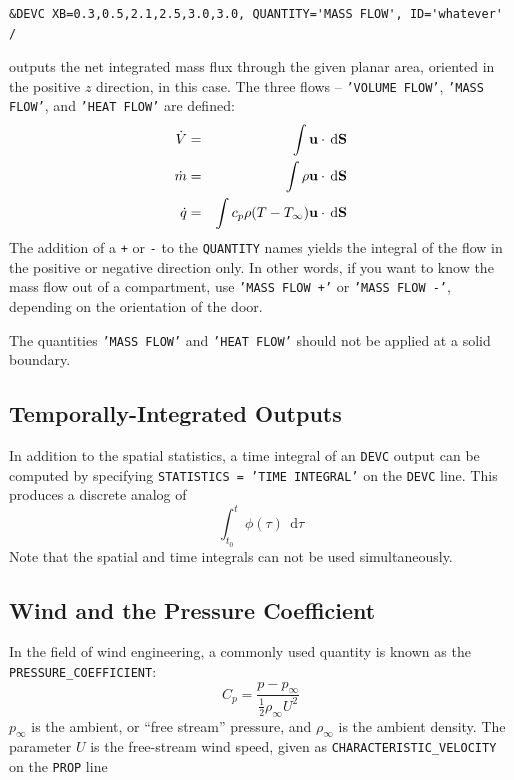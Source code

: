 \documentclass[11pt]{book}
\newcommand{\ct}{\tt\small}
\renewcommand{\d}{\,\mathrm{d}}
\newcommand{\bu}{{\bf u}}
\newcommand{\ha}{\frac{1}{2}}
\newcommand{\be}{\begin{equation}}
\newcommand{\ee}{\end{equation}}
\begin{document}
\footnotesize
\begin{verbatim}
&DEVC XB=0.3,0.5,2.1,2.5,3.0,3.0, QUANTITY='MASS FLOW', ID='whatever' /
\end{verbatim}
\normalsize

\noindent
outputs the net integrated mass flux through the given planar area, oriented in the positive $z$ direction, in this case. The three flows -- {\ct 'VOLUME FLOW'}, {\ct 'MASS FLOW'},
and {\ct 'HEAT FLOW'} are defined:
\begin{eqnarray*} \dot{V} &=& \int \bu \cdot \d \mathbf{S}  \\
                  \dot{m} &=& \int \rho \bu \cdot \d \mathbf{S} \\
                  \dot{q} &=& \int c_p \rho (T-T_\infty) \bu \cdot \d \mathbf{S} 
\end{eqnarray*}
The addition of a {\ct +} or {\ct -} to the {\ct QUANTITY} names
yields the integral of the flow in the positive or negative direction
only. In other words, if you want to know the mass flow out of a
compartment, use {\ct 'MASS FLOW +'} or {\ct 'MASS FLOW -'}, depending
on the orientation of the door.

\begin{warning}
The quantities {\ct 'MASS FLOW'} and {\ct 'HEAT FLOW'} should not be applied at a solid boundary.
\end{warning}

\subsection{Temporally-Integrated Outputs}
\label{info:time_integral}

In addition to the spatial statistics, a time integral of an {\ct DEVC} output can be computed by specifying
{\ct STATISTICS = 'TIME INTEGRAL'} on the {\ct DEVC} line. This produces a discrete analog of
\be
 \int_{t_0}^t \phi(\tau) \; \d \tau
\ee
Note that the spatial and time integrals can not be used simultaneously.



\subsection{Wind and the Pressure Coefficient}
\label{info:wind}

In the field of wind engineering, a commonly used quantity is known as
the {\ct PRESSURE\_COEFFICIENT}:
\be
   C_p = \frac{p-p_\infty}{\ha \rho_\infty U^2}
\ee
$p_\infty$ is the ambient, or ``free stream'' pressure, and
$\rho_\infty$ is the ambient density.  The parameter $U$ is the
free-stream wind speed, given as {\ct CHARACTERISTIC\_VELOCITY} on the
{\ct PROP} line
\end{document}
